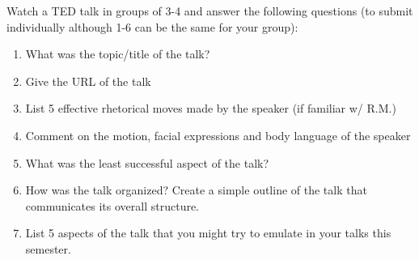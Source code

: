 \documentclass{fkpset}
\begin{document}
\begin{problem}[Exercise]
  Watch a TED talk in groups of 3-4 and answer the following questions (to
  submit individually although 1-6 can be the same for your group):
  \begin{enumerate}[label=\arabic*.]
    \item What was the topic/title of the talk?
    \item Give the URL of the talk
    \item List 5 effective rhetorical moves made by the speaker (if familiar w/
      R.M.)
    \item Comment on the motion, facial expressions and body language of the
      speaker
    \item What was the least successful aspect of the talk?
    \item How was the talk organized? Create a simple outline of the talk that
      communicates its overall structure.
    \item List 5 aspects of the talk that you might try to emulate in your talks
      this semester.
  \end{enumerate}
\end{problem}
\end{document}
